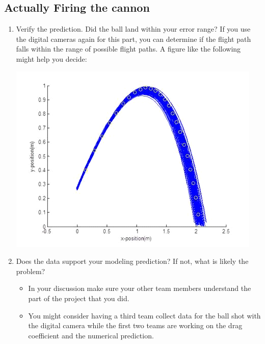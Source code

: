 \documentclass[twoside,11pt,ShortChapTitles]{BYUTextbook}
\begin{document}
\subsection{Actually Firing the cannon}
\begin{enumerate}
\item Verify the prediction. Did the ball land within your error range? If
you use the digital cameras again for this part, you can determine if the
flight path falls within the range of possible flight paths. A figure like
the following might help you decide:

\includegraphics[scale=0.5]{Lab9_figs/old_images-059.png}

\item Does the data support your modeling prediction? If not, what is likely
the problem?

\begin{itemize}
\item In your discussion make sure your other team members understand the
part of the project that you did.

\item You might consider having a third team collect data for the ball shot
with the digital camera while the first two teams are working on the drag
coefficient and the numerical prediction.
\end{itemize}


\end{enumerate}
\end{document}
